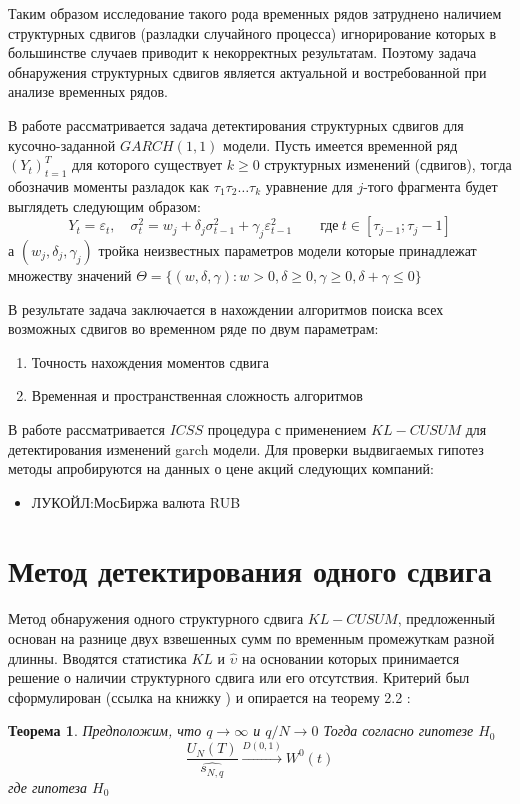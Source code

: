 \documentclass[a4paper,14pt,russian]{extarticle}
\newtheorem{thm}{Теорема}
\begin{document}
	\par
	Таким образом исследование такого рода временных рядов затруднено наличием структурных сдвигов (разладки случайного процесса) игнорирование которых в большинстве случаев приводит к некорректных результатам. Поэтому задача обнаружения структурных сдвигов является актуальной и востребованной при анализе временных рядов.
	\par
	В работе рассматривается задача детектирования структурных сдвигов для кусочно-заданной $GARCH(1, 1)$ модели. Пусть имеется временной ряд $(Y_t)_{t=1}^T$ для которого существует $k \geq 0$ структурных изменений (сдвигов), тогда обозначив моменты разладок как $\tau_1 \tau_2 \dots \tau_k$ уравнение для $j$-того фрагмента будет выглядеть следующим образом:
	\begin{equation}
		Y_t = \varepsilon_t, \quad \sigma_t^2 = w_j + \delta_j \sigma_{t-1}^2 + \gamma_j \varepsilon_{t-1}^2 \qquad \text{где} \ t \in \left[ \tau_{j - 1}; \tau_j - 1 \right] 
	\end{equation}
	а $(w_j, \delta_j, \gamma_j)$ тройка неизвестных параметров модели которые принадлежат множеству значений $\Theta = \{ (w, \delta, \gamma): w > 0, \delta \geq 0, \gamma \geq 0, \delta + \gamma \le 0 \} $
	\par
	В результате задача заключается в нахождении алгоритмов поиска всех возможных сдвигов во временном ряде по двум параметрам:
	\begin{enumerate}
		\item Точность нахождения моментов сдвига
		\item Временная и пространственная сложность алгоритмов
	\end{enumerate}
	\par
	В работе рассматривается $ICSS$ процедура с применением $KL-CUSUM$ для детектирования изменений garch модели. Для проверки выдвигаемых гипотез методы апробируются на данных о цене акций следующих компаний:
	\begin{itemize}
		\item ЛУКОЙЛ:МосБиржа валюта RUB
	\end{itemize}
	
	
	\clearpage
	\section{\label{sec:sec1}Метод детектирования одного сдвига}
	Метод обнаружения одного структурного сдвига $KL-CUSUM$, предложенный  основан на разнице двух взвешенных сумм по временным промежуткам разной длинны. Вводятся статистика $KL$ и $\hat{\upsilon}$ на основании которых принимается решение о наличии структурного сдвига или его отсутствия. Критерий был сформулирован (ссылка на книжку ) и опирается на теорему 2.2 \cite{Kokoszka}: 
	\begin{thm}
		\label{t1}
		Предположим, что $q \to \infty$ и $q/N \to 0$ Тогда согласно гипотезе $H_0$
		\begin{equation}
			\frac{U_N(T)}{\hat{s_{N, q}}} \xrightarrow[]{D(0,1)} W^0(t)
		\end{equation}
		где гипотеза $H_0$ 
	\end{thm}
\end{document}
